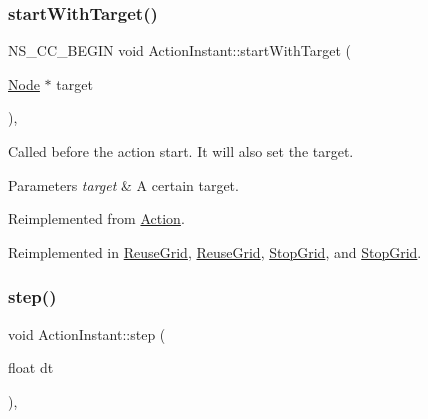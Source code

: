 \mbox{\label{classActionInstant_a47cff49ef73e126e5e9d6c26872a9e23}} 
\subsubsection{\texorpdfstring{start\+With\+Target()}{startWithTarget()}}
{\footnotesize\ttfamily N\+S\+\_\+\+C\+C\+\_\+\+B\+E\+G\+IN void Action\+Instant\+::start\+With\+Target (\begin{DoxyParamCaption}\item[{\hyperlink{classNode}{Node} $\ast$}]{target }\end{DoxyParamCaption})\hspace{0.3cm}{\ttfamily [override]}, {\ttfamily [virtual]}}

Called before the action start. It will also set the target.


\begin{DoxyParams}{Parameters}
{\em target} & A certain target. \\
\hline
\end{DoxyParams}


Reimplemented from \hyperlink{classAction_a5457090e4a035c6283777c893a9a681b}{Action}.



Reimplemented in \hyperlink{classReuseGrid_a7d81825e327a71fa4473f47aa4186f3b}{Reuse\+Grid}, \hyperlink{classReuseGrid_abf42c6057c8691102243dddcce1d749f}{Reuse\+Grid}, \hyperlink{classStopGrid_a1fc959f156e77a97e5d49c7cad546be1}{Stop\+Grid}, and \hyperlink{classStopGrid_ac08e33d5e58962f6b9e1048c10c5ea44}{Stop\+Grid}.

\mbox{\label{classActionInstant_ab6c8b1bb612803681a2727a1d5d7b5df}} 
\subsubsection{\texorpdfstring{step()}{step()}\hspace{0.1cm}{\footnotesize\ttfamily [1/2]}}
{\footnotesize\ttfamily void Action\+Instant\+::step (\begin{DoxyParamCaption}\item[{float}]{dt }\end{DoxyParamCaption})\hspace{0.3cm}{\ttfamily [override]}, {\ttfamily [virtual]}}


